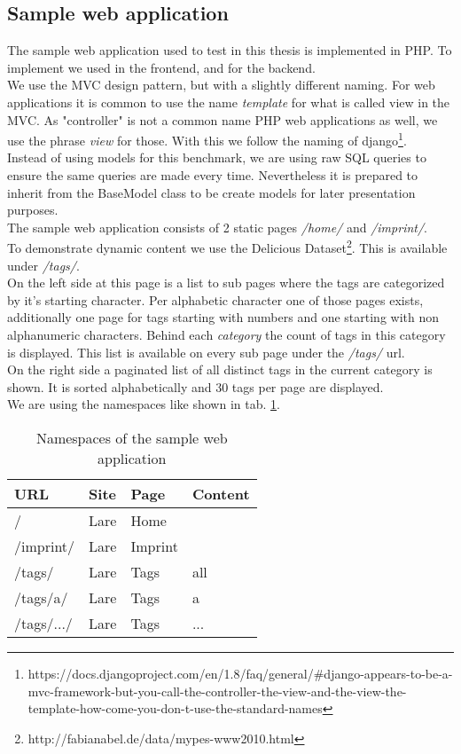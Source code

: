 \subsection{Sample web application}

The sample web application used to test \lare{} in this thesis is implemented in PHP.
To implement \lare{} we used \lareJS{} in the frontend, \twigLare{} and \phpLare{} for the backend.
\\
We use the MVC design pattern, but with a slightly different naming.
For web applications it is common to use the name \emph{template} for what is called view in the MVC.
As "controller" is not a common name PHP web applications as well, we use the phrase \emph{view} for those.
With this we follow the naming of django\footnote{https://docs.djangoproject.com/en/1.8/faq/general/\#django-appears-to-be-a-mvc-framework-but-you-call-the-controller-the-view-and-the-view-the-template-how-come-you-don-t-use-the-standard-names}.
\\
Instead of using models for this benchmark, we are using raw SQL queries to ensure the same queries are made every time.
Nevertheless it is prepared to inherit from the BaseModel class to be create models for later presentation purposes.
\\
The sample web application consists of 2 static pages \emph{/home/} and \emph{/imprint/}.
\\
To demonstrate dynamic content we use the Delicious Dataset\footnote{http://fabianabel.de/data/mypes-www2010.html}.
This is available under \emph{/tags/}.
\\
On the left side at this page is a list to sub pages where the tags are categorized by it's starting character.
Per alphabetic character one of those pages exists, additionally one page for tags starting with numbers and one starting with non alphanumeric characters.
Behind each \emph{category} the count of tags in this category is displayed.
This list is available on every sub page under the \emph{/tags/} url.
\\
On the right side a paginated list of all distinct tags in the current category is shown.
It is sorted alphabetically and 30 tags per page are displayed.
\\
We are using the namespaces like shown in tab. \ref{tab:sampleapp_namespaces}.

\begin{table}[h]
\centering
\begin{tabular}{llll}
	\hline
	\textbf{URL} & \textbf{Site} & \textbf{Page} & \textbf{Content} \\
	\hline
	/ & Lare & Home &  \\
	/imprint/ & Lare & Imprint &  \\
	/tags/ & Lare & Tags & all \\
	/tags/a/ & Lare & Tags & a \\
	/tags/.../ & Lare & Tags & ... \\
	\hline
\end{tabular}
\caption{Namespaces of the sample web application}
\label{tab:sampleapp_namespaces}
\end{table}


